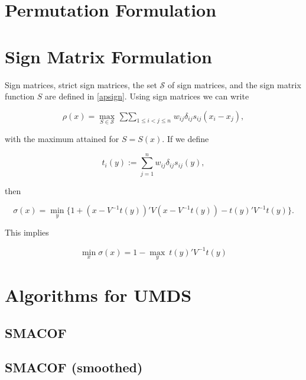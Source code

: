\documentclass[
  12pt,
]{book}
\theoremstyle{definition}
\theoremstyle{definition}
\theoremstyle{definition}
\theoremstyle{definition}
\theoremstyle{remark}
\begin{document}
\hypertarget{permutation-formulation}{%
\section{Permutation Formulation}\label{permutation-formulation}}

\hypertarget{sign-matrix-formulation}{%
\section{Sign Matrix Formulation}\label{sign-matrix-formulation}}

Sign matrices, strict sign matrices, the set \(\mathcal{S}\) of sign
matrices, and the sign matrix function \(S\) are defined in \ref{apsign}.
Using sign matrices we can write

\begin{equation}
\rho(x)=\max_{S\in\mathcal{S}}\mathop{\sum\sum}_{1\leq i<j\leq n}w_{ij}\delta_{ij}s_{ij}(x_i-x_j),
\label{eq:rhosign}
\end{equation}

with the maximum attained for \(S=S(x)\). If we define

\begin{equation}
t_i(y):=\sum_{j=1}^n w_{ij}\delta_{ij}s_{ij}(y),
\label{eq:tdef}
\end{equation}

then

\begin{equation}
\sigma(x)=\min_y\{1+(x-V^{-1}t(y))'V(x-V^{-1}t(y))-t(y)'V^{-1}t(y)\}.
\label{eq:unipart}
\end{equation}

\hfill\break

This implies

\begin{equation}
\min_x\sigma(x)= 1 - \max_y\ t(y)'V^{-1}t(y)
\label{eq:unidual}
\end{equation}

\hypertarget{unialgorithms}{%
\section{Algorithms for UMDS}\label{unialgorithms}}

\hypertarget{unismacof}{%
\subsection{SMACOF}\label{unismacof}}

\hypertarget{unismoothed}{%
\subsection{SMACOF (smoothed)}\label{unismoothed}}
\end{document}
